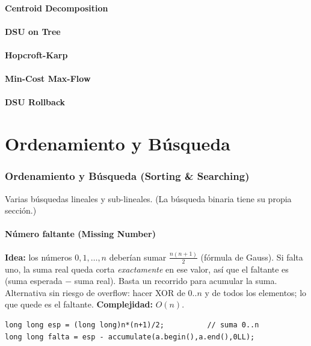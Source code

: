 \documentclass[10pt,a4paper,twocolumn]{article}
\begin{document}
\subsection{Centroid Decomposition}

\subsection{DSU on Tree}

\subsection{Hopcroft-Karp}

\subsection{Min-Cost Max-Flow}

\subsection{DSU Rollback}

\part{Ordenamiento y Búsqueda}

\section{Ordenamiento y Búsqueda (Sorting \& Searching)}
Varias búsquedas lineales y sub-lineales. (La búsqueda binaria tiene
su propia sección.)

\subsection{Número faltante (Missing Number)}
\textbf{Idea:} los números $0,1,\dots,n$ deberían sumar
$\frac{n(n+1)}{2}$ (fórmula de Gauss). Si falta uno, la suma real queda
corta \emph{exactamente} en ese valor, así que el faltante es
(suma esperada $-$ suma real). Basta un recorrido para acumular la suma.
Alternativa sin riesgo de overflow: hacer XOR de $0..n$ y de todos los
elementos; lo que quede es el faltante. \textbf{Complejidad:} $O(n)$.
\begin{lstlisting}[style=cpp]
long long esp = (long long)n*(n+1)/2;          // suma 0..n
long long falta = esp - accumulate(a.begin(),a.end(),0LL);
\end{lstlisting}
\end{document}
